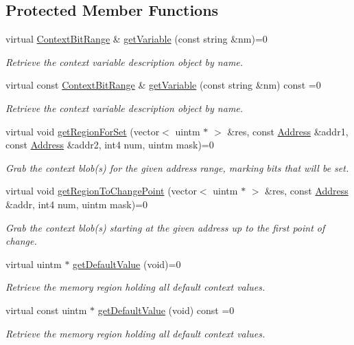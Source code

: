 \subsection*{Protected Member Functions}
\begin{DoxyCompactItemize}
\item 
virtual \mbox{\hyperlink{class_context_bit_range}{Context\+Bit\+Range}} \& \mbox{\hyperlink{class_context_database_a1ebd1d177e17c5ea1e877f8b1d8c581d}{get\+Variable}} (const string \&nm)=0
\begin{DoxyCompactList}\small\item\em Retrieve the context variable description object by name. \end{DoxyCompactList}\item 
virtual const \mbox{\hyperlink{class_context_bit_range}{Context\+Bit\+Range}} \& \mbox{\hyperlink{class_context_database_a91002953f968ee118476983ef49d525b}{get\+Variable}} (const string \&nm) const =0
\begin{DoxyCompactList}\small\item\em Retrieve the context variable description object by name. \end{DoxyCompactList}\item 
virtual void \mbox{\hyperlink{class_context_database_a0b1179b61de5ead9bc606d37231b6d24}{get\+Region\+For\+Set}} (vector$<$ uintm $\ast$ $>$ \&res, const \mbox{\hyperlink{class_address}{Address}} \&addr1, const \mbox{\hyperlink{class_address}{Address}} \&addr2, int4 num, uintm mask)=0
\begin{DoxyCompactList}\small\item\em Grab the context blob(s) for the given address range, marking bits that will be set. \end{DoxyCompactList}\item 
virtual void \mbox{\hyperlink{class_context_database_ac20e325921c1d8f5ad9fff37ff06b15f}{get\+Region\+To\+Change\+Point}} (vector$<$ uintm $\ast$ $>$ \&res, const \mbox{\hyperlink{class_address}{Address}} \&addr, int4 num, uintm mask)=0
\begin{DoxyCompactList}\small\item\em Grab the context blob(s) starting at the given address up to the first point of change. \end{DoxyCompactList}\item 
virtual uintm $\ast$ \mbox{\hyperlink{class_context_database_aaefe473eb8e2175df51c17d250d13c51}{get\+Default\+Value}} (void)=0
\begin{DoxyCompactList}\small\item\em Retrieve the memory region holding all default context values. \end{DoxyCompactList}\item 
virtual const uintm $\ast$ \mbox{\hyperlink{class_context_database_a615c33c424edd6ed84d73cdfb6d2e331}{get\+Default\+Value}} (void) const =0
\begin{DoxyCompactList}\small\item\em Retrieve the memory region holding all default context values. \end{DoxyCompactList}\end{DoxyCompactItemize}
